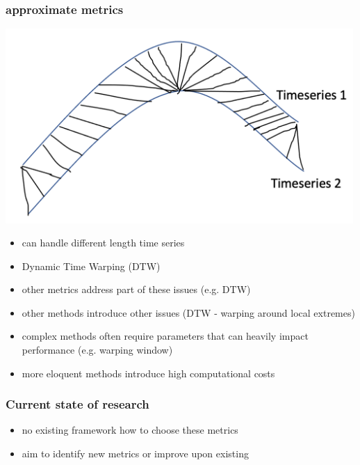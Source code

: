 \documentclass[11pt]{article}
\begin{document}
\subsubsection*{approximate metrics}
\label{sec:orgdcf7c43}
\begin{center}
\includegraphics[width=500px]{./img/dtw_metric.png}
\end{center}
\begin{itemize}
\item can handle different length time series
\item Dynamic Time Warping (DTW)
\end{itemize}
\begin{NOTES}
\begin{itemize}
\item other metrics address part of these issues (e.g. DTW)
\item other methods introduce other issues (DTW - warping around local extremes)
\item complex methods often require parameters that can heavily impact performance (e.g. warping window)
\item more eloquent methods introduce high computational costs
\end{itemize}
\end{NOTES}

\subsubsection*{Current state of research}
\label{sec:org014d234}
\begin{itemize}
\item no existing framework how to choose these metrics
\item aim to identify new metrics or improve upon existing
\end{itemize}
\end{document}
